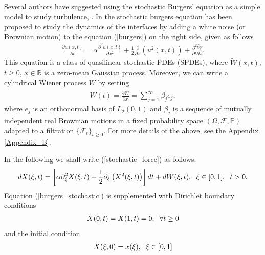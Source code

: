     Several authors have suggested using the stochastic Burgers' equation as a simple model to study turbulence, \cite{Chambers1988,CHOI1992,DAH-TENC1969,HOSOKAWA1975}.
    In \cite{KARDAR1986} the stochastic burgers equation has been proposed to study the dynamics of the interfaces by adding a white noise (or Brownian motion) to the equation (\ref{burgers}) on the right side, given as follows
    \begin{align}
    	\frac{\partial u(x, t)}{\partial t} = \alpha \frac{\partial^2 u(x, t)}{\partial x^2} + \frac{1}{2} \frac{\partial}{\partial x} (u^2 (x, t)) + \frac{\partial^2 \widetilde{W}}{\partial t \partial x}.
    	\label{stochastic_force} 
    \end{align}    
    This equation is a class of quasilinear stochastic PDEs (SPDEs), where $\widetilde{W} (x, t)$, $t \geq 0$, $x \in \mathbb{R}$ is a zero-mean Gaussian process. Moreover, we can write a cylindrical Wiener process $W$ by setting
    \begin{align*}
    	W(t) = \frac{\partial \widetilde{W}}{\partial x} = \displaystyle \sum_{j=1}^{\infty} \beta_j e_j,
    \end{align*}
    where ${e_j}$ is an orthonormal basis of $L_2 (0, 1)$ and ${\beta_j}$ is a sequence of mutually independent real Brownian motions in a fixed probability space $(\Omega, \mathcal{F}, \mathbb{P})$ adapted to a filtration $\{\mathcal{F}_t\}_{t \geq 0}$. For more details of the above, see the Appendix \ref{Appendix_B}.  
    
    \noindent In the following we shall write (\ref{stochastic_force}) as follows:
    \begin{align}
    	d X(\xi, t) = \left[ \alpha \partial_\xi^2 X(\xi, t) + \frac{1}{2} \partial_\xi \left(X^2 (\xi, t)\right) \right] dt + d W(\xi, t), \hspace{2mm} \xi \in [0, 1], \hspace{2mm} t > 0.
    	\label{burgers_stochastic}
    \end{align}
    Equation (\ref{burgers_stochastic}) is supplemented with Dirichlet boundary conditions
    \begin{align*}
    	X (0, t) = X (1, t) = 0, \hspace{2mm} \forall t \geq 0
    \end{align*}
    and the initial condition
    \begin{align*}
    	X(\xi, 0) = x(\xi), \hspace{2mm} \xi \in [0, 1] 
    \end{align*}
    
